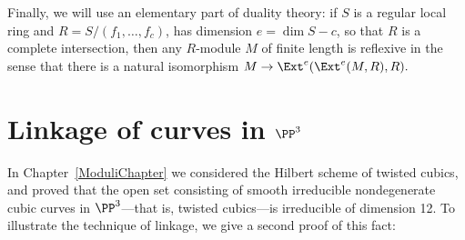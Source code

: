 Finally, we will use an elementary part of duality theory: if $S$ is a regular local ring and $R = S/(f_1,\dots, f_c)$, 
has dimension $e = \dim S-c$, so that $R$ is a complete intersection, then any $R$-module $M$ of finite length is reflexive
in the sense that there is a natural isomorphism
$M \to \Ext^e(\Ext^e(M, R), R).$

\section{Linkage of curves in $\PP^3$}\label{SLinkage}\label{linkage section}

In Chapter~\ref{ModuliChapter} we considered the Hilbert scheme of twisted cubics, and proved that the open set consisting of 
smooth irreducible nondegenerate cubic curves in $\PP^3$---that is, twisted cubics---is irreducible of
dimension 12. To illustrate the technique of linkage, we give a second proof of this fact:

